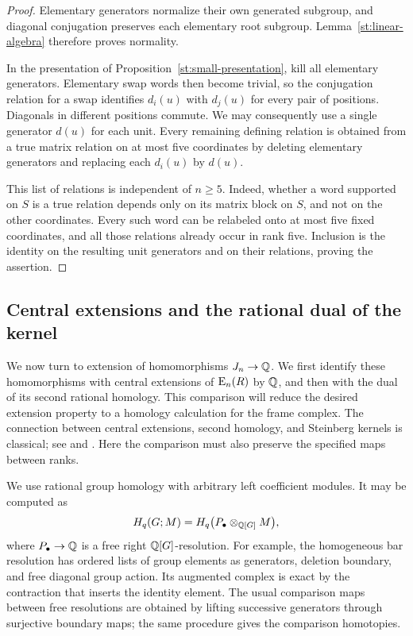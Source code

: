 \begin{proof}
Elementary generators normalize their own generated subgroup, and
diagonal conjugation preserves each elementary root subgroup.
Lemma~\ref{st:linear-algebra} therefore proves normality.

In the presentation of Proposition~\ref{st:small-presentation}, kill
all elementary generators. Elementary swap words then become trivial,
so the conjugation relation for a swap identifies $d_i(u)$ with
$d_j(u)$ for every pair of positions. Diagonals in different positions
commute. We may consequently use a single generator $d(u)$ for each
unit. Every remaining defining relation is obtained from a true
matrix relation on at most five coordinates by deleting elementary
generators and replacing each $d_i(u)$ by $d(u)$.

This list of relations is independent of $n\geq5$. Indeed, whether a
word supported on $S$ is a true relation depends only on its matrix
block on $S$, and not on the other coordinates. Every such word can
be relabeled onto at most five fixed coordinates, and all those
relations already occur in rank five. Inclusion is the identity on
the resulting unit generators and on their relations, proving the
assertion.
\end{proof}

\subsection{Central extensions and the rational dual of the kernel}

We now turn to extension of homomorphisms $J_n\to\mathbb Q$. We first
identify these homomorphisms with central extensions of $\operatorname{E}_n(R)$
by $\mathbb Q$, and then with the dual of its second rational homology.
This comparison will reduce the desired extension property to a
homology calculation for the frame complex. The connection between
central extensions, second homology, and Steinberg kernels is classical;
see \cite[Section~7]{Steinberg1967} and
\cite[Sections~III.5.3--III.5.5]{WeibelKbook}. Here the comparison
must also preserve the specified maps between ranks.

We use rational group homology with arbitrary left coefficient modules.
It may be computed as
\[
 H_q(G;M)=H_q\bigl(P_\bullet\otimes_{\mathbb Q[G]}M\bigr),
\]
where $P_\bullet\to\mathbb Q$ is a free right $\mathbb Q[G]$-resolution. For
example, the homogeneous bar resolution has ordered lists of group
elements as generators, deletion boundary, and free diagonal group
action. Its augmented complex is exact by the contraction that inserts
the identity element. The usual comparison maps between free
resolutions are obtained by lifting successive generators through
surjective boundary maps; the same procedure gives the comparison
homotopies.


